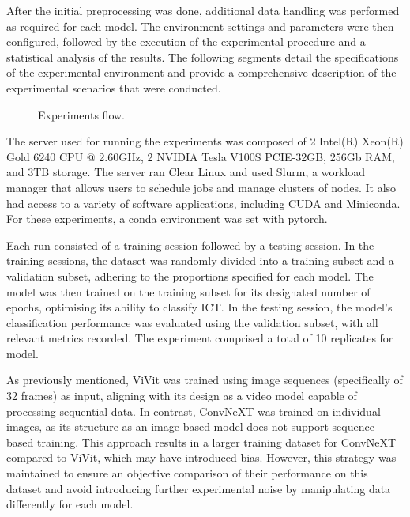 After the initial preprocessing was done, additional data handling was performed as required for each model. The environment settings and parameters were then configured, followed by the execution of the experimental procedure and a statistical analysis of the results. The following segments detail the specifications of the experimental environment and provide a comprehensive description of the experimental scenarios that were conducted.

\begin{figure}[h]
    \centering
    \scalebox{0.4}{}
    \caption{Experiments flow.}
    \label{fig:experiments_flow}
\end{figure}


The server used for running the experiments was composed of 2 Intel(R) Xeon(R) Gold 6240 CPU @ 2.60GHz, 2 NVIDIA Tesla V100S PCIE-32GB, 256Gb RAM, and 3TB storage. The server ran Clear Linux and used Slurm, a workload manager that allows users to schedule jobs and manage clusters of nodes. It also had access to a variety of software applications, including CUDA and Miniconda. For these experiments, a conda environment was set with pytorch.


Each run consisted of a training session followed by a testing session. In the training sessions, the dataset was randomly divided into a training subset and a validation subset, adhering to the proportions specified for each model. The model was then trained on the training subset for its designated number of epochs, optimising its ability to classify ICT. In the testing session, the model's classification performance was evaluated using the validation subset, with all relevant metrics recorded. The experiment comprised a total of 10 replicates for model.

As previously mentioned, ViVit was trained using image sequences (specifically of 32 frames) as input, aligning with its design as a video model capable of processing sequential data. In contrast, ConvNeXT was trained on individual images, as its structure as an image-based model does not support sequence-based training. This approach results in a larger training dataset for ConvNeXT compared to ViVit, which may have introduced bias. However, this strategy was maintained to ensure an objective comparison of their performance on this dataset and avoid introducing further experimental noise by manipulating data differently for each model.

